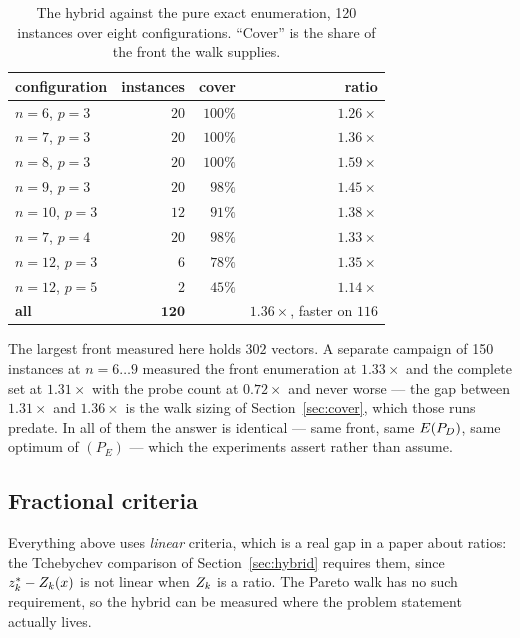 \documentclass[11pt,a4paper]{article}
\begin{document}
\begin{table}[h]
\centering
\caption{The hybrid against the pure exact enumeration, 120 instances over
eight configurations.  ``Cover'' is the share of the front the walk supplies.}
\label{tab:hybrid}
\begin{tabular}{lrrr}
\toprule
configuration & instances & cover & ratio \\
\midrule
$n=6$, $p=3$  & $20$ & $100\%$ & $1.26\times$ \\
$n=7$, $p=3$  & $20$ & $100\%$ & $1.36\times$ \\
$n=8$, $p=3$  & $20$ & $100\%$ & $\mathbf{1.59\times}$ \\
$n=9$, $p=3$  & $20$ & $98\%$  & $1.45\times$ \\
$n=10$, $p=3$ & $12$ & $91\%$  & $1.38\times$ \\
$n=7$, $p=4$  & $20$ & $98\%$  & $1.33\times$ \\
$n=12$, $p=3$ & $6$  & $78\%$  & $1.35\times$ \\
$n=12$, $p=5$ & $2$  & $45\%$  & $1.14\times$ \\
\midrule
\textbf{all} & $\mathbf{120}$ & & $\mathbf{1.36\times}$, faster on $116$ \\
\bottomrule
\end{tabular}
\end{table}

\noindent
The largest front measured here holds $302$ vectors.  A separate campaign of
150 instances at $n = 6 \dots 9$ measured the front enumeration at
$1.33\times$ and the complete set at $1.31\times$ with the probe count at
$0.72\times$ and never worse --- the gap between $1.31\times$ and
$1.36\times$ is the walk sizing of Section~\ref{sec:cover}, which those runs
predate.  In all of them the answer is identical --- same front, same $E(P_{D})$,
same optimum of $(P_E)$ --- which the experiments assert rather than assume.

\subsection{Fractional criteria}
\label{sec:fracres}

Everything above uses \emph{linear} criteria, which is a real gap in a paper
about ratios: the Tchebychev comparison of Section~\ref{sec:hybrid} requires
them, since $z^{*}_k - Z_k(x)$ is not linear when $Z_k$ is a ratio.  The
Pareto walk has no such requirement, so the hybrid can be measured where the
problem statement actually lives.
\end{document}
